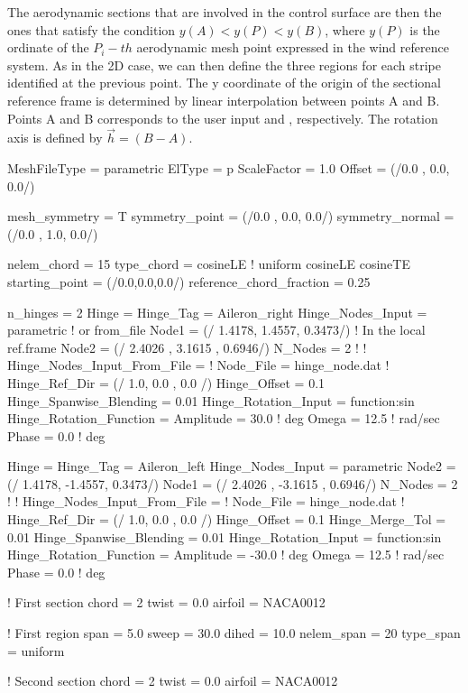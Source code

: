 The aerodynamic sections that are involved in the control surface are then the ones that satisfy the condition $y(A) < y(P) < y(B)$, where $y(P)$ is the ordinate of the $P_i-th$ aerodynamic mesh point expressed in the wind reference system. 
As in the 2D case, we can then define the three regions for each stripe identified at the previous point. The y coordinate of the origin of the sectional reference frame is determined by linear interpolation between points A and B. 
Points A and B corresponds to the user input  and , respectively. The rotation axis is defined by $\Vec{h} = (B - A)$.

\begin{inputfile}[frame=single, caption={Parametric geometry for flapped wing}, label={file:parametric_example_flapped_wing.in}]
MeshFileType = parametric
ElType = p
ScaleFactor = 1.0
Offset = (/0.0 , 0.0,  0.0/)

mesh_symmetry = T
symmetry_point   = (/0.0 , 0.0,  0.0/)
symmetry_normal = (/0.0 , 1.0,  0.0/)

nelem_chord = 15
type_chord = cosineLE   ! uniform  cosineLE  cosineTE
starting_point = (/0.0,0.0,0.0/)
reference_chord_fraction = 0.25

n_hinges = 2
Hinge = {
  Hinge_Tag = Aileron_right
  Hinge_Nodes_Input = parametric      ! or from_file
  Node1 = (/ 1.4178, 1.4557, 0.3473/)  ! In the local ref.frame
  Node2 = (/ 2.4026  , 3.1615  , 0.6946/)
  N_Nodes = 2
  ! }
  ! Hinge_Nodes_Input_From_File = {
  !   Node_File = hinge_node.dat
  ! }
  Hinge_Ref_Dir = (/ 1.0, 0.0 , 0.0 /)
  Hinge_Offset  = 0.1
  Hinge_Spanwise_Blending = 0.01
  Hinge_Rotation_Input = function:sin
  Hinge_Rotation_Function = {
    Amplitude = 30.0    ! deg
    Omega     =  12.5   ! rad/sec
    Phase     =  0.0    ! deg
  }

Hinge = {
  Hinge_Tag = Aileron_left
  Hinge_Nodes_Input = parametric      
  Node2 = (/ 1.4178, -1.4557, 0.3473/)  
  Node1 = (/ 2.4026  , -3.1615  , 0.6946/)
  N_Nodes = 2
  ! }
  ! Hinge_Nodes_Input_From_File = {
  !   Node_File = hinge_node.dat
  ! }
  Hinge_Ref_Dir = (/ 1.0, 0.0 , 0.0 /)
  Hinge_Offset  = 0.1
  Hinge_Merge_Tol = 0.01
  Hinge_Spanwise_Blending = 0.01
  Hinge_Rotation_Input = function:sin
  Hinge_Rotation_Function = {
    Amplitude = -30.0    ! deg
    Omega     =  12.5    ! rad/sec
    Phase     =  0.0     ! deg
  }


! First section
chord = 2
twist = 0.0
airfoil = NACA0012

! First region
span = 5.0
sweep = 30.0
dihed = 10.0
nelem_span = 20
type_span = uniform

! Second section
chord = 2
twist = 0.0
airfoil = NACA0012
\end{inputfile}

